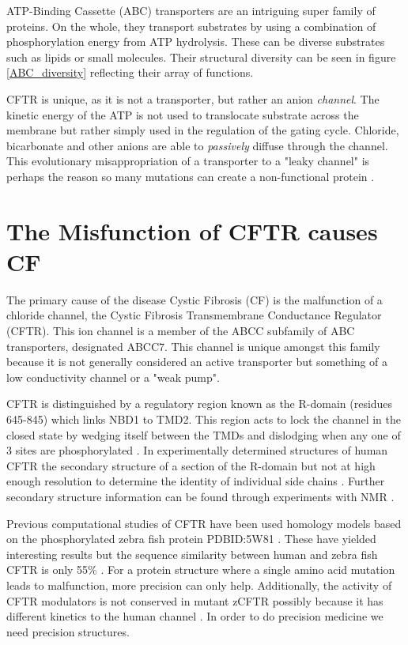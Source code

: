 ATP-Binding Cassette (ABC) transporters are an intriguing super family of proteins. On the whole, they transport substrates by using a combination of phosphorylation energy from ATP hydrolysis. These can be diverse substrates such as lipids or small molecules. Their structural diversity can be seen in figure \ref{ABC_diversity} reflecting their array of functions. 

CFTR is unique, as it is not a transporter, but rather an anion \textit{channel}. The kinetic energy of the ATP is not used to translocate substrate across the membrane but rather simply used in the regulation of the gating cycle. Chloride, bicarbonate and other anions are able to \textit{passively} diffuse through the channel. This evolutionary misappropriation of a transporter to a "leaky channel" is perhaps the reason so many mutations can create a non-functional protein \cite{linsdell2018}.

\section{The Misfunction of CFTR causes CF}

The primary cause of the disease Cystic Fibrosis (CF) is the malfunction of a chloride channel, the Cystic Fibrosis Transmembrane Conductance Regulator (CFTR). This ion channel is a member of the ABCC subfamily of ABC transporters, designated ABCC7. This channel is unique amongst this family because it is not generally considered an active transporter but something of a low conductivity channel or a "weak pump"\cite{linsdell2018}.

CFTR is distinguished by a regulatory region known as the R-domain (residues 645-845) which links NBD1 to TMD2. This region acts to lock the channel in the closed state by wedging itself between the TMDs and dislodging when any one of 3 sites are phosphorylated \cite{mihalyi2020}. In experimentally determined structures of human CFTR the secondary structure of a section of the R-domain but not at high enough resolution to determine the identity of individual side chains \cite{zhang2018, zhang2016}. Further secondary structure information can be found through experiments with NMR \cite{Baker2007}.

Previous computational studies of CFTR have been used homology models based on the phosphorylated zebra fish protein PDBID:5W81 \cite{zhang2017a}. These have yielded interesting results but the sequence similarity between human and zebra fish CFTR is only 55\% \cite{}. For a protein structure where a single amino acid mutation leads to malfunction, more precision can only help. Additionally, the activity of CFTR modulators is not conserved in mutant zCFTR possibly because it has different kinetics to the human channel \cite{}. In order to do precision medicine we need precision structures. 

